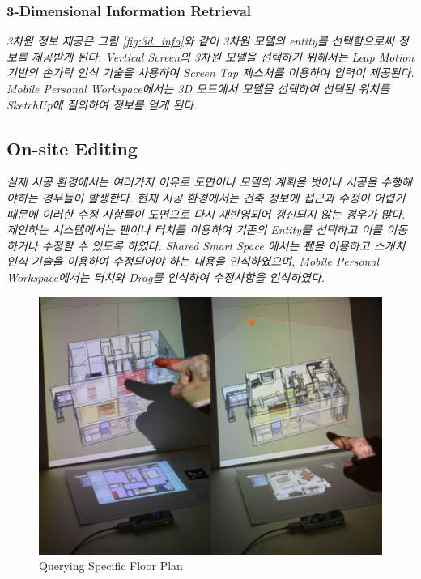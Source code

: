 \subsubsection{3-Dimensional Information Retrieval}
\textit{3차원 정보 제공은 그림 \ref{fig:3d_info}와 같이 3차원 모델의 \textit{entity}를 선택함으로써 정보를 제공받게 된다. Vertical Screen의 3차원 모델을 선택하기 위해서는 Leap Motion 기반의 손가락 인식 기술을 사용하여 Screen Tap 제스처를 이용하여 입력이 제공된다. Mobile Personal Workspace에서는 3D 모드에서 모델을 선택하여 선택된 위치를 SketchUp에 질의하여 정보를 얻게 된다.}



\subsection{On-site Editing}
\textit{
실제 시공 환경에서는 여러가지 이유로 도면이나 모델의 계획을 벗어나 시공을 수행해야하는 경우들이 발생한다. 현재 시공 환경에서는 건축 정보에 접근과 수정이 어렵기 때문에 이러한 수정 사항들이 도면으로 다시 재반영되어 갱신되지 않는 경우가 많다. 제안하는 시스템에서는 펜이나 터치를 이용하여 기존의 Entity를 선택하고 이를 이동하거나 수정할 수 있도록 하였다. Shared Smart Space 에서는 펜을 이용하고 스케치 인식 기술을 이용하여 수정되어야 하는 내용을 인식하였으며, Mobile Personal Workspace에서는 터치와 Drag를 인식하여 수정사항을 인식하였다.}
 \begin{figure}[h!]
\centering
\includegraphics[width=0.9\columnwidth]{4-Interaction_Design/query_plane}
\caption{Querying Specific Floor Plan}
\label{fig:layer}
\end{figure}
